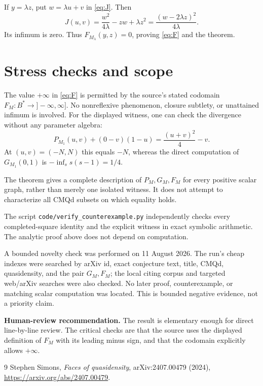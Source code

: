 \documentclass[11pt]{article}
\begin{document}
If $y=\lambda z$, put $w=\lambda u+v$ in \eqref{eq:J}.  Then
\[
 J(u,v)
 =\frac{w^2}{4\lambda}-zw+\lambda z^2
 =\frac{(w-2\lambda z)^2}{4\lambda}.
\]
Its infimum is zero.  Thus $F_{M_\lambda}(y,z)=0$, proving
\eqref{eq:F} and the theorem.

\section{Stress checks and scope}

The value $+\infty$ in \eqref{eq:F} is permitted by the source's stated
codomain $F_M\colon B^*\to]-\infty,\infty]$.  No nonreflexive phenomenon,
closure subtlety, or unattained infimum is involved.  For the displayed
witness, one can check the divergence without any parameter algebra:
\[
 P_{M_1}(u,v)+(0-v)(1-u)=\frac{(u+v)^2}{4}-v.
\]
At $(u,v)=(-N,N)$ this equals $-N$, whereas the direct computation of
$G_{M_1}(0,1)$ is $-\inf_s s(s-1)=1/4$.

The theorem gives a complete description of $P_M,G_M,F_M$ for every
positive scalar graph, rather than merely one isolated witness.  It does
not attempt to characterize all CMQd subsets on which equality holds.

The script \texttt{code/verify\_counterexample.py} independently checks
every completed-square identity and the explicit witness in exact symbolic
arithmetic.  The analytic proof above does not depend on computation.

A bounded novelty check was performed on 11 August 2026.  The run's cheap
indexes were searched by arXiv id, exact conjecture text, title, CMQd,
quasidensity, and the pair $G_M,F_M$; the local citing corpus and targeted
web/arXiv searches were also checked.  No later proof, counterexample, or
matching scalar computation was located.  This is bounded negative
evidence, not a priority claim.

\textbf{Human-review recommendation.}  The result is elementary enough for
direct line-by-line review.  The critical checks are that the source uses
the displayed definition of $F_M$ with its leading minus sign, and that
the codomain explicitly allows $+\infty$.

\begin{thebibliography}{9}
\small
{}
Stephen Simons,
\emph{Faces of quasidensity},
arXiv:2407.00479 (2024),
\url{https://arxiv.org/abs/2407.00479}.
\end{thebibliography}
\end{document}
